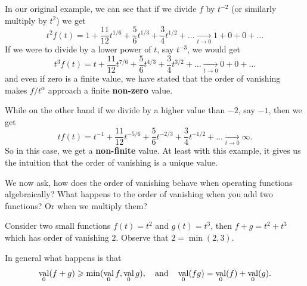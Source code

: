 \documentclass[12pt]{memoir}
\DeclareMathOperator{\val}{val}
\theoremstyle{definition}
\begin{document}
\begin{Ex}
    In our original example, we can see that if we divide $f$ by $t^{-2}$ (or similarly multiply by $t^2$) we get 
$$t^2f(t) = 1 + \frac{11}{12}t^{1/6} + \frac{5}{6}t^{1/3} + \frac{3}{4}t^{1/2} + \dots \xrightarrow[t\to0]{} 1 + 0 + 0 + \dots$$
If we were to divide by a lower power of $t$, say $t^{-3}$, we would get 
$$t^3f(t) = t + \frac{11}{12}t^{7/6} + \frac{5}{6}t^{4/3} + \frac{3}{4}t^{3/2} + \dots \xrightarrow[t\to0]{} 0 + 0 + \dots$$
and even if zero is a finite value, we have stated that the order of vanishing makes $f/t^\alpha$ approach a finite \textbf{non-zero} value.\par 
While on the other hand if we divide by a higher value than $-2$, say $-1$, then we get 
$$tf(t) = t^{-1} + \frac{11}{12}t^{-5/6} + \frac{5}{6}t^{-2/3} + \frac{3}{4}t^{-1/2} + \dots \xrightarrow[t\to0]{} \infty.$$
So in this case, we get a \textbf{non-finite} value. At least with this example, it gives us the intuition that the order of vanishing is a unique value.

\end{Ex}

We now ask, how does the order of vanishing behave when operating functions algebraically? What happens to the order of vanishing when you add two functions? Or when we multiply them?

\begin{Ex}
    Consider two small functions $f(t)=t^2$ and $g(t)=t^3$, then $f+g=t^2+t^3$ which has order of vanishing $2$. Observe that $2=\min(2,3)$.
\end{Ex}

In general what happens is that
$$\val_0(f+g)\geq\min(\val_0 f,\val_0 g),\word{and}\val_0(fg)=\val_0(f)+\val_0(g).$$
\end{document}
